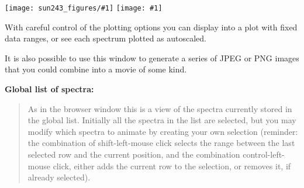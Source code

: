 \documentclass[twoside,11pt,nolof]{starlink}
\providecommand{\mainfigure}[1]
{\begin{center}
    \ifpdf
    \texttt{[image: sun243\_figures/\#1]}
    \else
    \texttt{[image: \#1]}
    \fi
 \end{center}
}
\providecommand{\subheading}[1]{\textbf{\large{#1}}}
\begin{document}
\mainfigure{animationwindow}

With careful control of the plotting options you can display into a
plot with fixed data ranges, or see each spectrum plotted as
autoscaled.

It is also possible to use this window to generate a series of JPEG or PNG
images that you could combine into a movie of some kind.

\subheading{Global list of spectra:}
\begin{quote}
 As in the browser window this is a view of the spectra currently
 stored in the global list. Initially all the spectra in the list are
 selected, but you may modify which spectra to animate by creating your
 own selection (reminder: the combination of shift-left-mouse click
 selects the range between the last selected row and the current
 position, and the combination control-left-mouse click, either adds
 the current row to the selection, or removes it, if already selected).
\end{quote}
\end{document}

